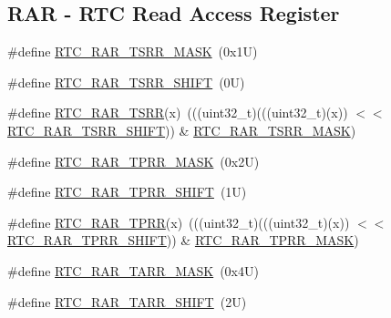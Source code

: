 \subsection*{R\+AR -\/ R\+TC Read Access Register}
\begin{DoxyCompactItemize}
\item 
\#define \mbox{\hyperlink{group___r_t_c___register___masks_ga0f5e27ed705469977779fdde12c123d1}{R\+T\+C\+\_\+\+R\+A\+R\+\_\+\+T\+S\+R\+R\+\_\+\+M\+A\+SK}}~(0x1\+U)
\item 
\#define \mbox{\hyperlink{group___r_t_c___register___masks_ga818fe20844147f1e5844214424365459}{R\+T\+C\+\_\+\+R\+A\+R\+\_\+\+T\+S\+R\+R\+\_\+\+S\+H\+I\+FT}}~(0\+U)
\item 
\#define \mbox{\hyperlink{group___r_t_c___register___masks_ga5212291e6e08ea71c1ba5ec639b8e026}{R\+T\+C\+\_\+\+R\+A\+R\+\_\+\+T\+S\+RR}}(x)~(((uint32\+\_\+t)(((uint32\+\_\+t)(x)) $<$$<$ \mbox{\hyperlink{group___r_t_c___register___masks_ga818fe20844147f1e5844214424365459}{R\+T\+C\+\_\+\+R\+A\+R\+\_\+\+T\+S\+R\+R\+\_\+\+S\+H\+I\+FT}})) \& \mbox{\hyperlink{group___r_t_c___register___masks_ga0f5e27ed705469977779fdde12c123d1}{R\+T\+C\+\_\+\+R\+A\+R\+\_\+\+T\+S\+R\+R\+\_\+\+M\+A\+SK}})
\item 
\#define \mbox{\hyperlink{group___r_t_c___register___masks_ga24600addfa3bdab90a5c154586725247}{R\+T\+C\+\_\+\+R\+A\+R\+\_\+\+T\+P\+R\+R\+\_\+\+M\+A\+SK}}~(0x2\+U)
\item 
\#define \mbox{\hyperlink{group___r_t_c___register___masks_ga822bd340bfb1d1bb31647e665ead6fa2}{R\+T\+C\+\_\+\+R\+A\+R\+\_\+\+T\+P\+R\+R\+\_\+\+S\+H\+I\+FT}}~(1\+U)
\item 
\#define \mbox{\hyperlink{group___r_t_c___register___masks_ga3c56da3e92966b869c7c01747585ecf6}{R\+T\+C\+\_\+\+R\+A\+R\+\_\+\+T\+P\+RR}}(x)~(((uint32\+\_\+t)(((uint32\+\_\+t)(x)) $<$$<$ \mbox{\hyperlink{group___r_t_c___register___masks_ga822bd340bfb1d1bb31647e665ead6fa2}{R\+T\+C\+\_\+\+R\+A\+R\+\_\+\+T\+P\+R\+R\+\_\+\+S\+H\+I\+FT}})) \& \mbox{\hyperlink{group___r_t_c___register___masks_ga24600addfa3bdab90a5c154586725247}{R\+T\+C\+\_\+\+R\+A\+R\+\_\+\+T\+P\+R\+R\+\_\+\+M\+A\+SK}})
\item 
\#define \mbox{\hyperlink{group___r_t_c___register___masks_ga33ae5982aca9e8f6c95d69127938e30c}{R\+T\+C\+\_\+\+R\+A\+R\+\_\+\+T\+A\+R\+R\+\_\+\+M\+A\+SK}}~(0x4\+U)
\item 
\#define \mbox{\hyperlink{group___r_t_c___register___masks_ga65e8ec7e88a1f0583d53c603bdab1615}{R\+T\+C\+\_\+\+R\+A\+R\+\_\+\+T\+A\+R\+R\+\_\+\+S\+H\+I\+FT}}~(2\+U)

\end{DoxyCompactItemize}
